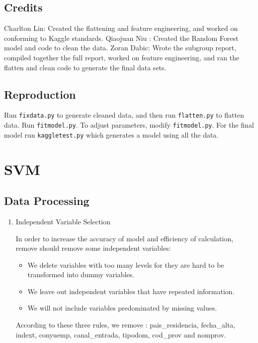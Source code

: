 \documentclass{article}
\begin{document}
\begin{spacing}{1}
\begin{large}
\subsection{Credits}

Charlton Lin: Created the flattening and feature engineering, and worked on conforming to Kaggle standards.
Qiaojuan Niu : Created the Random Forest model and code to clean the data.
Zoran Dabic: Wrote the subgroup report, compiled together the full report, worked on feature engineering, and ran the flatten and clean code to generate the final data sets.

\subsection{Reproduction}
Run \texttt{fixdata.py} to generate cleaned data, and then run \texttt{flatten.py} to flatten data. Run \texttt{fitmodel.py}. To adjust parameters, modify \texttt{fitmodel.py}. For the final model run \texttt{kaggletest.py} which generates a model using all the data.

\section{SVM}

\subsection{Data Processing}
\begin{enumerate}
	\item Independent Variable Selection

	In order to increase the accuracy of model and efficiency of calculation, remove should remove some independent variables:

	\begin{itemize}
		\item  We delete variables with too many levels for they are hard to be transformed into dummy variables.

		\item We leave out independent variables that have repeated information.

		\item We will not include  variables predominated by missing values.
	\end{itemize}

	According to these three  rules, we remove : pais\_residencia, fecha\_alta, indext, conyuemp, canal\_entrada, tipodom, cod\_prov and nomprov.


\end{enumerate}
\end{large}
\end{spacing}
\end{document}
